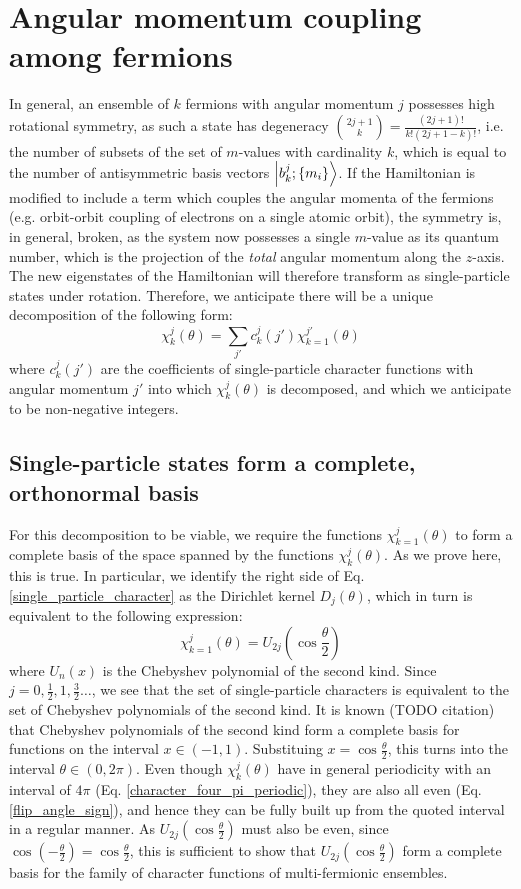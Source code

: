 \documentclass[12pt]{article}
\begin{document}
	\section{Angular momentum coupling among fermions}
	In general, an ensemble of $k$ fermions with angular momentum $j$ possesses high rotational symmetry, as such a state has degeneracy $\binom{2j+1}{k}=\frac{(2j+1)!}{k!(2j+1-k)!}$, i.e. the number of subsets of the set of $m$-values with cardinality $k$, which is equal to the number of antisymmetric basis vectors $\ket{b^j_k; \{m_i\}}$. If the Hamiltonian is modified to include a term which couples the angular momenta of the fermions (e.g. orbit\nobreakdash-orbit coupling of electrons on a single atomic orbit), the symmetry is, in general, broken, as the system now possesses a single $m$-value as its quantum number, which is the projection of the \textit{total} angular momentum along the $z$-axis. The new eigenstates of the Hamiltonian will therefore transform as single-particle states under rotation. Therefore, we anticipate there will be a unique decomposition of the following form:
	\begin{equation}
	\chi^j_k(\theta)=\sum_{j'}c^j_k(j')\chi^{j'}_{k=1}(\theta)
	\end{equation}
	where $c^j_k(j')$ are the coefficients of single-particle character functions with angular momentum $j'$ into which $\chi^j_k(\theta)$ is decomposed, and which we anticipate to be non-negative integers.
	
	\subsection{Single-particle states form a complete, orthonormal basis}
	For this decomposition to be viable, we require the functions $\chi^j_{k=1}(\theta)$ to form a complete basis of the space spanned by the functions $\chi^j_k(\theta)$. As we prove here, this is true. In particular, we identify the right side of Eq. \ref{single_particle_character} as the Dirichlet kernel $D_j(\theta)$, which in turn is equivalent to the following expression:
	\begin{equation}
	\chi^j_{k=1}(\theta)=U_{2j}\left(\cos{\frac{\theta}{2}}\right)
	\end{equation}
	where $U_{n}(x)$ is the Chebyshev polynomial of the second kind. Since $j=0, \frac{1}{2}, 1, \frac{3}{2}\dots$, we see that the set of single-particle characters is equivalent to the set of Chebyshev polynomials of the second kind. It is known (TODO citation) that Chebyshev polynomials of the second kind form a complete basis for functions on the interval $x\in(-1,1)$. Substituing $x=\cos{\frac{\theta}{2}}$, this turns into the interval $\theta\in (0, 2\pi)$. Even though $\chi^j_k(\theta)$ have in general periodicity with an interval of $4\pi$ (Eq. \ref{character_four_pi_periodic}), they are also all even (Eq. \ref{flip_angle_sign}), and hence they can be fully built up from the quoted interval in a regular manner. As $U_{2j}(\cos{\frac{\theta}{2}})$ must also be even, since $\cos(-\frac{\theta}{2})=\cos{\frac{\theta}{2}}$, this is sufficient to show that $U_{2j}(\cos{\frac{\theta}{2}})$ form a complete basis for the family of character functions of multi-fermionic ensembles.
	
\end{document}
